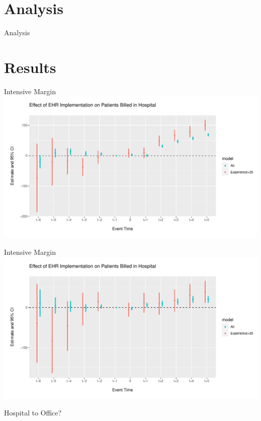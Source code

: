 \documentclass[10pt]{beamer}
\begin{document}
\section{Analysis}

\begin{frame}{Analysis}


    
\end{frame}

\section{Results}

\begin{frame}{Intensive Margin}
\centering
\includegraphics[scale=.45]{Objects/event_plot.pdf}
\end{frame}

\begin{frame}{Intensive Margin}
\centering
\includegraphics[scale=.45]{Objects/event_hosp_plot.pdf}
\end{frame}

\begin{frame}{Hospital to Office?}
    
\end{frame}
\end{document}
